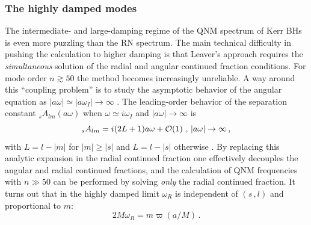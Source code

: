 \documentclass[]{iopart}
\def\be{\begin{equation}}
\def\ee{\end{equation}}
\begin{document}
\subsubsection*{\label{highdamp}The highly damped modes}

The intermediate- and large-damping regime of the QNM spectrum of Kerr BHs is
even more puzzling than the RN spectrum. The main technical difficulty in
pushing the calculation to higher damping is that Leaver's approach requires
the {\it simultaneous} solution of the radial and angular continued fraction
conditions.  For mode order $n\gtrsim 50$ the method becomes increasingly
unreliable. A way around this ``coupling problem'' is to study the asymptotic
behavior of the angular equation as $|a\omega|\simeq |a \omega_I|\to \infty$
\cite{Berti:2004um,Berti:2005gp}. The leading-order behavior of the separation
constant $_sA_{lm}(a\omega)$ when $\omega\simeq i \omega_I$ and $|a\omega|\to
\infty$ is
%
\begin{equation}
_{s}A_{lm}=i(2L+1) a\omega+ {\cal O}(1) \,\,,\, |a\omega| \rightarrow \infty \,,
\label{alm}
\end{equation}
%
with $L=l-|m|$ for $|m| \geq |s|$ and $L=l-|s|$ otherwise
\cite{Berti:2004um,Berti:2005gp}.
By replacing this analytic expansion in the radial continued fraction one
effectively decouples the angular and radial continued fractions, and the
calculation of QNM frequencies with $n\gg 50$ can be performed by solving {\it
  only} the radial continued fraction. It turns out that in the highly damped
limit $\omega_R$ is independent of $(s\,,l)$ and proportional to $m$:
%
\be
2M\omega_R=m \varpi(a/M)\,. \label{varpikerr}
\ee
%
\end{document}

